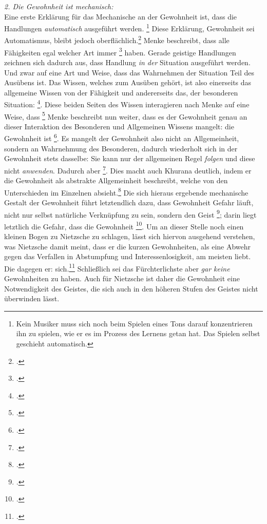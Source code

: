 \documentclass[12pt, a4paper, openany]{report}
\begin{document}
\emph{2. Die Gewohnheit ist mechanisch:}\\
Eine erste Erklärung für das Mechanische an der Gewohnheit ist, dass die Handlungen \emph{automatisch} ausgeführt werden.%
\footnote{
    Kein Musiker muss sich noch beim Spielen eines Tons darauf konzentrieren ihn zu spielen, wie er es im Prozess des Lernens getan hat. 
    Das Spielen selbst geschieht automatisch.
}
Diese Erklärung, Gewohnheit sei Automatismus, bleibt jedoch oberflächlich.\footcite[Vgl.][132]{menke_autonomie_2018}
Menke beschreibt, dass alle Fähigkeiten egal welcher Art immer \footcite[][132]{menke_autonomie_2018} haben. 
Gerade geistige Handlungen zeichnen sich dadurch aus, dass Handlung \emph{in der} Situation ausgeführt werden.
Und zwar auf eine Art und Weise, dass das Wahrnehmen der Situation Teil des Ausübens ist. 
Das Wissen, welches zum Ausüben gehört, ist also einerseits das allgemeine Wissen von der Fähigkeit und andererseits das, der besonderen Situation: \footcite[][133]{menke_autonomie_2018}.
Diese beiden Seiten des Wissen interagieren nach Menke auf eine Weise, dass \footcite[][133]{menke_autonomie_2018}
Menke beschreibt nun weiter, dass es der Gewohnheit genau an dieser Interaktion des Besonderen und Allgemeinen Wissens mangelt:
die Gewohnheit ist \footcite[][§410 Zusatz, S. 188]{hegel_enzyklopädie_1969}.
Es mangelt der Gewohnheit also nicht an Allgemeinheit, sondern an Wahrnehmung des Besonderen, dadurch wiederholt sich in der Gewohnheit stets dasselbe:
Sie kann nur der allgemeinen Regel \emph{folgen} und diese nicht \emph{anwenden}. 
Dadurch aber \footcite[][134]{menke_autonomie_2018}.
Dies macht auch Khurana deutlich, indem er die Gewohnheit als abstrakte Allgemeinheit beschreibt, welche von den Unterschieden im Einzelnen absieht.\footcite[Vgl.][431]{khurana_freiheit_2017}
Die sich hieraus ergebende mechanische Gestalt der Gewohnheit führt letztendlich dazu, dass Gewohnheit Gefahr läuft, nicht nur selbst natürliche Verknüpfung zu sein, sondern den Geist \footcite[][430]{khurana_freiheit_2017};
darin liegt letztlich die Gefahr, dass die Gewohnheit \footcite[][§410 (Anmerkung), S. 189]{khurana_freiheit_2017}.
Um an dieser Stelle noch einen kleinen Bogen zu Nietzsche zu schlagen, lässt sich hiervon ausgehend verstehen, was Nietzsche damit meint, dass er die kurzen Gewohnheiten, als eine Abwehr gegen das Verfallen in Abstumpfung und Interessenlosigkeit, am meisten liebt.
Die  dagegen  er:  sich.\footcite[][§295, S. 535.]{nietzsche_morgenrote_1999}
Schließlich sei das Fürchterlichste aber \emph{gar keine} Gewohnheiten zu haben.
Auch für Nietzsche ist daher die Gewohnheit eine Notwendigkeit des Geistes, die sich auch in den höheren Stufen des Geistes nicht überwinden lässt. 
\end{document}
